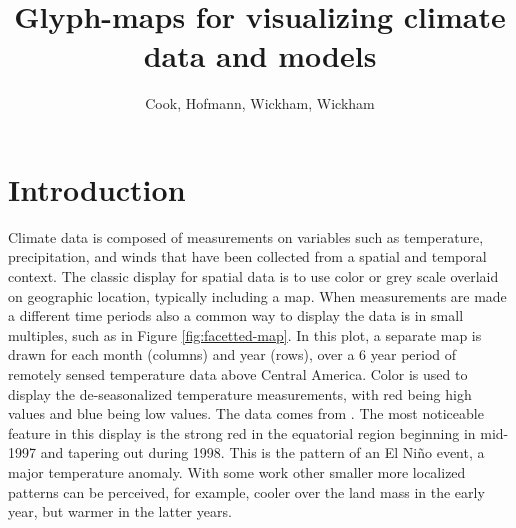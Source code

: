 \documentclass[oneside]{article}
\begin{document}
\title{Glyph-maps for visualizing climate data and models}
\author{Cook, Hofmann, Wickham, Wickham}


%
%
\maketitle

\section{Introduction}

Climate data is composed of measurements on variables such as temperature, precipitation, and winds that have been collected from a spatial and temporal context. The classic display for spatial data is to use color or grey scale overlaid on geographic location, typically including a map. When measurements are made a different time periods also a common way to display the data is in small multiples, such as in Figure \ref{fig:facetted-map}. In this plot, a separate map is drawn for each month (columns) and year (rows), over a 6 year period of remotely sensed temperature data above Central America. Color is used to display the de-seasonalized temperature measurements, with red being high values and blue being low values. The data  comes from \cite{NASA-Data-Expo}. The most noticeable feature in this display is the strong red in the equatorial region beginning in mid-1997 and tapering out during 1998. This is the pattern of an El Ni\~no event, a major temperature anomaly. With some work other smaller more localized patterns can be perceived, for example, cooler over the land mass in the early year, but warmer in the latter years.
\end{document}
